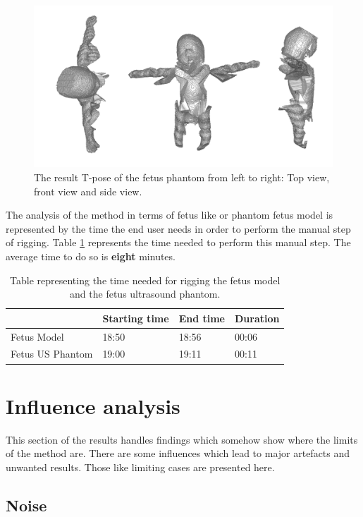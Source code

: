 \begin{figure} [htb!]
    \centering
	\includegraphics[width=16cm]{content/images/results/fetusPhantumResult.png}
	\caption{The result T-pose of the fetus phantom from left to right: Top view, front view and side view.}
	\label{fig:}
\end{figure}

\clearpage
The analysis of the method in terms of fetus like or phantom fetus model is represented by the time the end user needs in order to perform the manual step of rigging. Table \ref{tbl:fetusPerformance} represents the time needed to perform this manual step. The average time to do so is \textbf{eight} minutes.

\begin{table}[!htb]
    \centering
    \begin{tabular}{l|l|l|l}
                   & Starting time & End time & Duration \\\hline
    Fetus Model     & 18:50         & 18:56    & 00:06    \\\hline
    Fetus US Phantom & 19:00         & 19:11    & 00:11   
    \end{tabular}
    \label{tbl:fetusPerformance}
    \caption{Table representing the time needed for rigging the fetus model and the fetus ultrasound phantom.}
\end{table}

\section{Influence analysis}
This section of the results handles findings which somehow show where the limits of the method are. There are some influences which lead to major artefacts and unwanted results. Those like limiting cases are  presented here.

\subsection{Noise}

